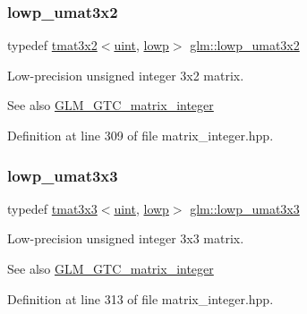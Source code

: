 \subsubsection{\texorpdfstring{lowp\_umat3x2}{lowp\_umat3x2}}
{\footnotesize\ttfamily typedef \mbox{\hyperlink{structglm_1_1tmat3x2}{tmat3x2}}$<$\mbox{\hyperlink{group__core__precision_ga4fd29415871152bfb5abd588334147c8}{uint}}, \mbox{\hyperlink{namespaceglm_a0f04f086094c747d227af4425893f545ae161af3fc695e696ce3bf69f7332bc2d}{lowp}}$>$ \mbox{\hyperlink{group__gtc__matrix__integer_ga3ea8482ddaa10befe8dc2d681d86bb59}{glm\+::lowp\+\_\+umat3x2}}}

Low-\/precision unsigned integer 3x2 matrix. \begin{DoxySeeAlso}{See also}
\mbox{\hyperlink{group__gtc__matrix__integer}{G\+L\+M\+\_\+\+G\+T\+C\+\_\+matrix\+\_\+integer}} 
\end{DoxySeeAlso}


Definition at line 309 of file matrix\+\_\+integer.\+hpp.

\mbox{\label{group__gtc__matrix__integer_gab27a50de8b11ec09b2f5cf1cf4c1a062}} 
\subsubsection{\texorpdfstring{lowp\_umat3x3}{lowp\_umat3x3}}
{\footnotesize\ttfamily typedef \mbox{\hyperlink{structglm_1_1tmat3x3}{tmat3x3}}$<$\mbox{\hyperlink{group__core__precision_ga4fd29415871152bfb5abd588334147c8}{uint}}, \mbox{\hyperlink{namespaceglm_a0f04f086094c747d227af4425893f545ae161af3fc695e696ce3bf69f7332bc2d}{lowp}}$>$ \mbox{\hyperlink{group__gtc__matrix__integer_gab27a50de8b11ec09b2f5cf1cf4c1a062}{glm\+::lowp\+\_\+umat3x3}}}

Low-\/precision unsigned integer 3x3 matrix. \begin{DoxySeeAlso}{See also}
\mbox{\hyperlink{group__gtc__matrix__integer}{G\+L\+M\+\_\+\+G\+T\+C\+\_\+matrix\+\_\+integer}} 
\end{DoxySeeAlso}


Definition at line 313 of file matrix\+\_\+integer.\+hpp.

\mbox{\label{group__gtc__matrix__integer_ga2ed807c71afb8c0f8742bb03e9f71829}} 
